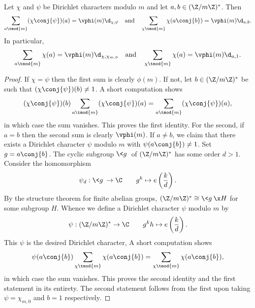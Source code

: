 \documentclass[12pt]{article}
\begin{document}
      \begin{proposition*}
      Let \(\chi\) and \(\psi\) be Dirichlet characters modulo \(m\) and let \(a,b \in (\Z/m\Z)^{\ast}\). Then
      \[
        \sum_{a \tmod{m}}(\chi\conj{\psi})(a) = \vphi(m)\d_{\chi,\psi} \quad \text{and} \quad \sum_{\chi \tmod{m}}\chi(a\conj{b}) = \vphi(m)\d_{a,b}.
      \]
      In particular,
      \[
        \sum_{a \tmod{m}}\chi(a) = \vphi(m)\d_{\chi,\chi_{m,0}} \quad \text{and} \quad \sum_{\chi \tmod{m}}\chi(a) = \vphi(m)\d_{a,1}.
      \]
      \end{proposition*}
      \begin{proof}
        If \(\chi = \psi\) then the first sum is clearly \(\phi(m)\). If not, let \(b \in (\Z/m\Z)^{\ast}\) be such that \((\chi\conj{\psi})(b) \neq 1\). A short computation shows
        \[
          (\chi\conj{\psi})(b)\sum_{a \tmod{m}}(\chi\conj{\psi})(a) = \sum_{a \tmod{m}}(\chi\conj{\psi})(a),
        \]
        in which case the sum vanishes. This proves the first identity. For the second, if \(a = b\) then the second sum is clearly \(\vphi(m)\). If \(a \neq b\), we claim that there exists a Dirichlet character \(\psi\) modulo \(m\) with \(\psi(a\conj{b}) \neq 1\). Set \(g = a\conj{b}\). The cyclic subgroup \(\<g\>\) of \((\Z/m\Z)^{\ast}\) has some order \(d > 1\). Consider the homomorphism
        \[
          \psi_{d}:\<g\> \to \C \qquad g^{k} \mapsto e\left(\frac{k}{d}\right).
        \]
        By the structure theorem for finite abelian groups, \((\Z/m\Z)^{\ast} \cong \<g\> \x H\) for some subgroup \(H\). Whence we define a Dirichlet character \(\psi\) modulo \(m\) by
        \[
          \psi:(\Z/m\Z)^{\ast} \to \C \qquad g^{k}h \mapsto e\left(\frac{k}{d}\right).
        \]
        This \(\psi\) is the desired Dirichlet character, A short computation shows
        \[
          \psi(a\conj{b})\sum_{\chi \tmod{m}}\chi(a\conj{b}) = \sum_{\chi \tmod{m}}\chi(a\conj{b}),
        \]
        in which case the sum vanishes. This proves the second identity and the first statement in its entirety. The second statement follows from the first upon taking \(\psi = \chi_{m,0}\) and \(b = 1\) respectively.
      \end{proof}
\end{document}
